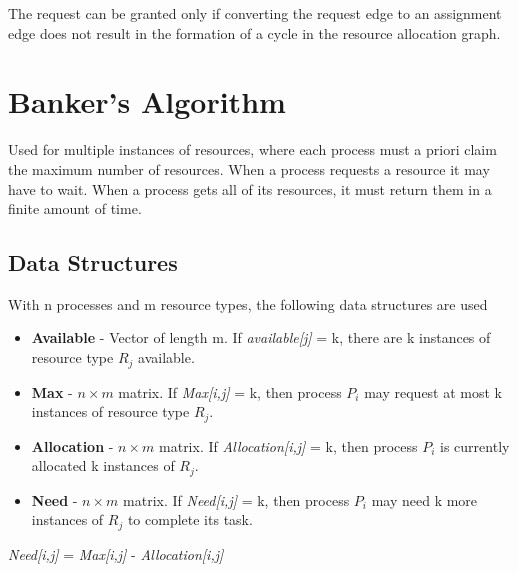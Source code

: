 \documentclass{book/custombook}
\begin{document}
            The request can be granted only if converting the request edge to an assignment edge does not result 
            in the formation of a cycle in the resource allocation graph.
        \section{Banker's Algorithm}
            Used for multiple instances of resources, where each process must a priori claim the maximum number of resources.
            When a process requests a resource it may have to wait. When a process gets all of its resources, it must return them
            in a finite amount of time.
            \subsection{Data Structures}
                With n processes and m resource types, the following data structures are used
                \begin{itemize}
                    \item \textbf{Available} - Vector of length m. If \textit{available[j]} = k,
                    there are k instances of resource type $R_j$ available.
                    \item \textbf{Max} - $n\times m$ matrix. If \textit{Max[i,j]} = k, then process $P_i$ may
                    request at most k instances of resource type $R_j$.
                    \item \textbf{Allocation} - $n\times m$ matrix. If \textit{Allocation[i,j]} = k, then
                    process $P_i$ is currently allocated k instances of $R_j$.
                    \item \textbf{Need} - $n\times m$ matrix. If \textit{Need[i,j]} = k, then process $P_i$
                    may need k more instances of $R_j$ to complete its task.
                \end{itemize}
                \begin{center}
                    \textit{Need[i,j]} = \textit{Max[i,j]} - \textit{Allocation[i,j]}
                \end{center}
\end{document}

